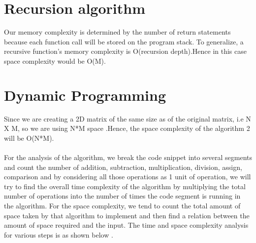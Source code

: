 \documentclass[conference]{IEEEtran}
\begin{document}
\section*{Recursion algorithm}
Our memory complexity is determined by the number of return statements because each function call will be stored on the program stack. To generalize, a recursive function's memory complexity is O(recursion depth).Hence in this case space complexity would be O(M).\bigskip

\section*{Dynamic Programming}


Since we are creating a 2D matrix of the same size as of the original matrix, i.e N X M, so we are using N*M space .Hence, the space complexity of the algorithm 2 will be O(N*M).\\\\

For the analysis of the algorithm, we break the code snippet into several segments and count the number of addition, subtraction, multiplication, division, assign, comparison and by considering all those operations as 1 unit of operation, we will try to find the overall time complexity of the algorithm by multiplying the total  number of operations into the number of times the code segment is running in the algorithm. For the space complexity, we tend to count the total amount of space taken by that algorithm to implement and then find a relation between the amount of space required and the input. The time and space complexity analysis for various steps is as shown below .\\

\bigskip
\end{document}
